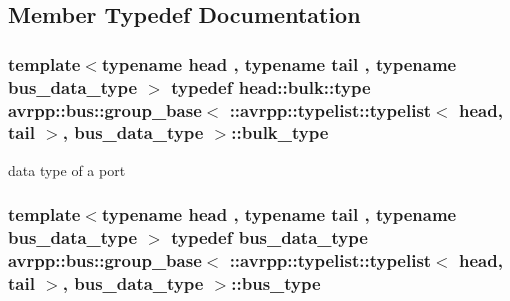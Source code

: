 \subsection{Member Typedef Documentation}
\hypertarget{structavrpp_1_1bus_1_1group__base_3_01_1_1avrpp_1_1typelist_1_1typelist_3_01head_00_01tail_01_4_00_01bus__data__type_01_4_aabf304c3e2b2801e376ef2bf62a2062a}{
\subsubsection[{bulk\_\-type}]{\setlength{\rightskip}{0pt plus 5cm}template$<$typename head , typename tail , typename bus\_\-data\_\-type $>$ typedef head::bulk::type avrpp::bus::group\_\-base$<$ ::{\bf avrpp::typelist::typelist}$<$ head, tail $>$, bus\_\-data\_\-type $>$::{\bf bulk\_\-type}}}
\label{structavrpp_1_1bus_1_1group__base_3_01_1_1avrpp_1_1typelist_1_1typelist_3_01head_00_01tail_01_4_00_01bus__data__type_01_4_aabf304c3e2b2801e376ef2bf62a2062a}


data type of a port 

\hypertarget{structavrpp_1_1bus_1_1group__base_3_01_1_1avrpp_1_1typelist_1_1typelist_3_01head_00_01tail_01_4_00_01bus__data__type_01_4_a6bb1dd5bee9245aaace9d610a03fa8f9}{
\subsubsection[{bus\_\-type}]{\setlength{\rightskip}{0pt plus 5cm}template$<$typename head , typename tail , typename bus\_\-data\_\-type $>$ typedef bus\_\-data\_\-type avrpp::bus::group\_\-base$<$ ::{\bf avrpp::typelist::typelist}$<$ head, tail $>$, bus\_\-data\_\-type $>$::{\bf bus\_\-type}}}
\label{structavrpp_1_1bus_1_1group__base_3_01_1_1avrpp_1_1typelist_1_1typelist_3_01head_00_01tail_01_4_00_01bus__data__type_01_4_a6bb1dd5bee9245aaace9d610a03fa8f9}



